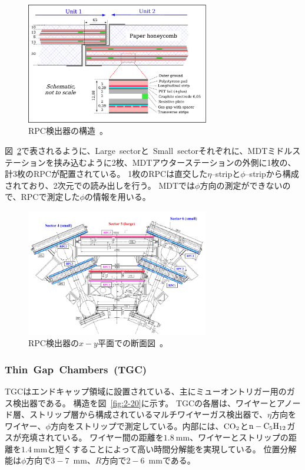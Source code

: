 \begin{figure}[h]
  \centering
  \includegraphics[clip, width=8cm]{fig/2/RPC_structure.pdf}
  \caption{RPC検出器の構造~\cite{Aad:1129811}。}
  \label{fig:2-18}
\end{figure}

図~\ref{fig:2-19}で表されるように、Large~sectorと~Small~sectorそれぞれに、MDTミドルステーションを挟み込むように2枚、MDTアウターステーションの外側に1枚の、計3枚のRPCが配置されている。
1枚のRPCは直交した$\eta$--stripと$\phi$--stripから構成されており、2次元での読み出しを行う。
MDTでは$\phi$方向の測定ができないので、RPCで測定した$\phi$の情報を用いる。

\begin{figure}[h]
  \centering
  \includegraphics[clip, width=8cm]{fig/2/RPC_xy.pdf}
  \caption{RPC検出器の$x-y$平面での断面図~\cite{Aad:1129811}。}
  \label{fig:2-19}
\end{figure}

\subsubsection{Thin~Gap~Chambers~(TGC)}
TGCはエンドキャップ領域に設置されている、主にミューオントリガー用のガス検出器である。
構造を図~\ref{fig:2-20}に示す。
TGCの各層は、ワイヤーとアノード層、ストリップ層から構成されているマルチワイヤーガス検出器で、$\eta$方向をワイヤー、$\phi$方向をストリップで測定している。内部には、$\rm{CO_{2}}$と$\rm{n - C_{5}H_{12}}$ガスが充填されている。
ワイヤー間の距離を$\SI{1.8}{\mm}$、ワイヤーとストリップの距離を$\SI{1.4}{\mm}$と短くすることによって高い時間分解能を実現している。
位置分解能は$\phi$方向で$3-7$~$\si{\mm}$、$R$方向で$2-6$~$\si{\mm}$である。


